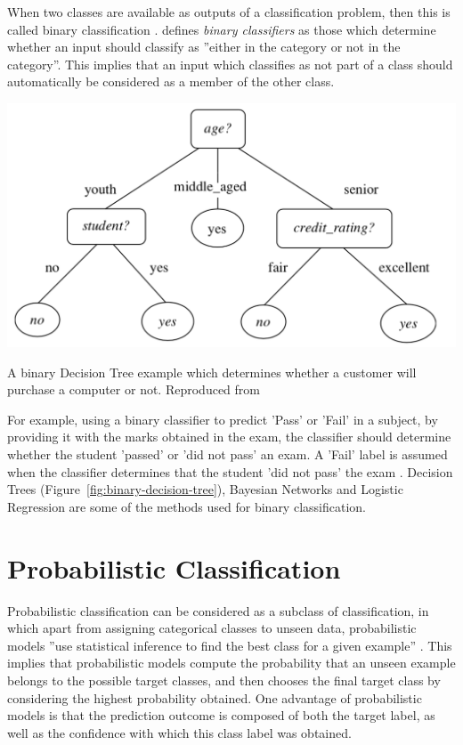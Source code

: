 When two classes are available as outputs of a classification problem, then this is called binary classification \citep{neelamegam2013}. \citet{kolo2011} defines \textit{binary classifiers} as those which determine whether an input should classify as ''either in the category or not in the category''. This implies that an input which classifies as not part of a class should automatically be considered as a member of the other class. \begin{marginfigure}
    \includegraphics{graphics/classification/BinaryDecisionTree.png}
    \caption{
    A binary Decision Tree example which determines whether a customer will purchase a computer or not. 
    Reproduced from \citep{jiawei2011}
    }
    \label{fig:binary-decision-tree}
\end{marginfigure}
For example,  using a binary classifier to predict 'Pass' or 'Fail' in a subject, by providing it with the marks obtained in the exam, the classifier should determine whether the student 'passed' or 'did not pass' an exam. A 'Fail' label is assumed when the classifier determines that the student 'did not pass' the exam \citep{kolo2011}. Decision Trees (Figure~\ref{fig:binary-decision-tree}), Bayesian Networks and Logistic Regression are some of the methods used for binary classification.  

\section{Probabilistic Classification}
\label{sec:probabilistic classification}
Probabilistic classification can be considered as a subclass of classification, in which apart from assigning categorical classes to unseen data, probabilistic models ''use statistical inference to find the best class for a given example'' \citep{aggarwal2014}. This implies that probabilistic models compute the probability that an unseen example belongs to the possible target classes, and then chooses the final target class by considering the highest probability obtained. One advantage of probabilistic models is that the prediction outcome is composed of both the target label, as well as the confidence with which this class label was obtained. 

